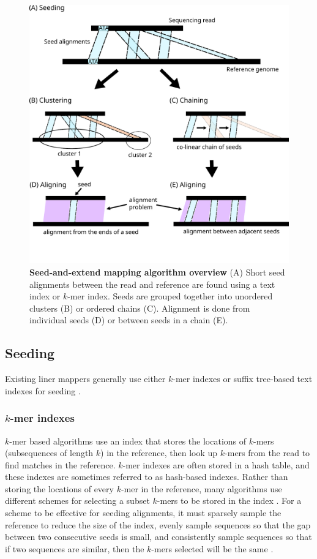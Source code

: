 \documentclass[11pt]{ucscthesis}
\begin{document}
\begin{figure}
\centering
\includegraphics[width=0.8\columnwidth]{mapping_algorithm_overview.pdf}
\caption[Seed-and-extend mapping algorithm overview]{\textbf{Seed-and-extend mapping algorithm overview} (A) Short seed alignments between the read and reference are found using a text index or $k$-mer index. Seeds are grouped together into unordered clusters (B) or ordered chains (C). Alignment is done from individual seeds (D) or between seeds in a chain (E).}
\label{fig:mapping_overview}
\end{figure}


\subsection{Seeding}

Existing liner mappers generally use either $k$-mer indexes or suffix tree-based text indexes for seeding \cite{li_survey_2010,sahlin_survey_2023}.


\subsubsection{$k$-mer indexes}

$k$-mer based algorithms use an index that stores the locations of $k$-mers (subsequences of length $k$) in the reference, then look up $k$-mers from the read to find matches in the reference.
$k$-mer indexes are often stored in a hash table, and these indexes are sometimes referred to as hash-based indexes.
Rather than storing the locations of every $k$-mer in the reference, many algorithms use different schemes for selecting a subset $k$-mers to be stored in the index \cite{li_minimap2_2018,lee_mosaik_2014,jain_mashmap_2018, edgar_urmap_2020,edgar_syncmers_2021}.
For a scheme to be effective for seeding alignments, it must sparsely sample the reference to reduce the size of the index, evenly sample sequences so that the gap between two consecutive seeds is small, and consistently sample sequences so that if two sequences are similar, then the $k$-mers selected will be the same \cite{marcais_improving_2017}.
\end{document}
